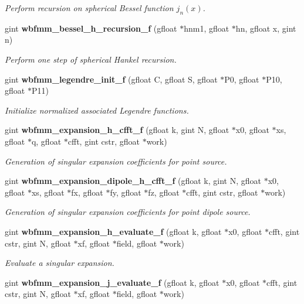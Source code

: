 \begin{DoxyCompactItemize}
\begin{DoxyCompactList}\small\item\em Perform recursion on spherical Bessel function $j_{n}(x)$. \end{DoxyCompactList}\item 
gint \textbf{ wbfmm\+\_\+bessel\+\_\+h\+\_\+recursion\+\_\+f} (gfloat $\ast$hnm1, gfloat $\ast$hn, gfloat x, gint n)
\begin{DoxyCompactList}\small\item\em Perform one step of spherical Hankel recursion. \end{DoxyCompactList}\item 
gint \textbf{ wbfmm\+\_\+legendre\+\_\+init\+\_\+f} (gfloat C, gfloat S, gfloat $\ast$P0, gfloat $\ast$P10, gfloat $\ast$P11)
\begin{DoxyCompactList}\small\item\em Initialize normalized associated Legendre functions. \end{DoxyCompactList}\item 
gint \textbf{ wbfmm\+\_\+expansion\+\_\+h\+\_\+cfft\+\_\+f} (gfloat k, gint N, gfloat $\ast$x0, gfloat $\ast$xs, gfloat $\ast$q, gfloat $\ast$cfft, gint cstr, gfloat $\ast$work)
\begin{DoxyCompactList}\small\item\em Generation of singular expansion coefficients for point source. \end{DoxyCompactList}\item 
gint \textbf{ wbfmm\+\_\+expansion\+\_\+dipole\+\_\+h\+\_\+cfft\+\_\+f} (gfloat k, gint N, gfloat $\ast$x0, gfloat $\ast$xs, gfloat $\ast$fx, gfloat $\ast$fy, gfloat $\ast$fz, gfloat $\ast$cfft, gint cstr, gfloat $\ast$work)
\begin{DoxyCompactList}\small\item\em Generation of singular expansion coefficients for point dipole source. \end{DoxyCompactList}\item 
gint \textbf{ wbfmm\+\_\+expansion\+\_\+h\+\_\+evaluate\+\_\+f} (gfloat k, gfloat $\ast$x0, gfloat $\ast$cfft, gint cstr, gint N, gfloat $\ast$xf, gfloat $\ast$field, gfloat $\ast$work)
\begin{DoxyCompactList}\small\item\em Evaluate a singular expansion. \end{DoxyCompactList}\item 
gint \textbf{ wbfmm\+\_\+expansion\+\_\+j\+\_\+evaluate\+\_\+f} (gfloat k, gfloat $\ast$x0, gfloat $\ast$cfft, gint cstr, gint N, gfloat $\ast$xf, gfloat $\ast$field, gfloat $\ast$work)

\end{DoxyCompactItemize}
